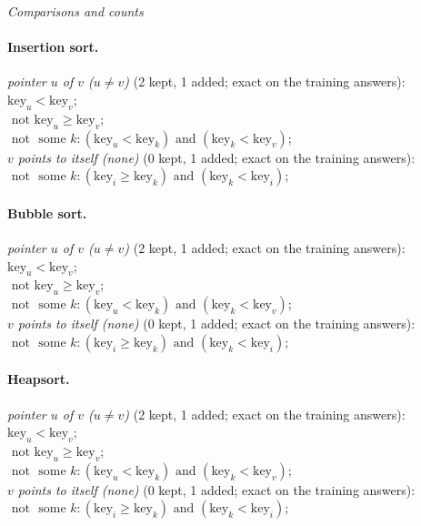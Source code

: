 \documentclass[10pt]{article}
\begin{document}
{\small
\medskip\noindent\textit{Comparisons and counts}\par
\paragraph{Insertion sort.}
\emph{pointer $u$ of $v$ ($u \neq v$)} (2 kept, 1 added; exact on the training answers):\\
\quad $\mathrm{key}_{u} < \mathrm{key}_{v}$;\\
\quad $\text{ not } \mathrm{key}_{u}  \geq  \mathrm{key}_{v}$;\\
\quad $\text{ not } \text{ some } k: (\mathrm{key}_{u} < \mathrm{key}_{k}) \text{ and } (\mathrm{key}_{k} < \mathrm{key}_{v})$;\\
\emph{$v$ points to itself (none)} (0 kept, 1 added; exact on the training answers):\\
\quad $\text{ not } \text{ some } k: (\mathrm{key}_{i}  \geq  \mathrm{key}_{k}) \text{ and } (\mathrm{key}_{k} < \mathrm{key}_{i})$;

\paragraph{Bubble sort.}
\emph{pointer $u$ of $v$ ($u \neq v$)} (2 kept, 1 added; exact on the training answers):\\
\quad $\mathrm{key}_{u} < \mathrm{key}_{v}$;\\
\quad $\text{ not } \mathrm{key}_{u}  \geq  \mathrm{key}_{v}$;\\
\quad $\text{ not } \text{ some } k: (\mathrm{key}_{u} < \mathrm{key}_{k}) \text{ and } (\mathrm{key}_{k} < \mathrm{key}_{v})$;\\
\emph{$v$ points to itself (none)} (0 kept, 1 added; exact on the training answers):\\
\quad $\text{ not } \text{ some } k: (\mathrm{key}_{i}  \geq  \mathrm{key}_{k}) \text{ and } (\mathrm{key}_{k} < \mathrm{key}_{i})$;

\paragraph{Heapsort.}
\emph{pointer $u$ of $v$ ($u \neq v$)} (2 kept, 1 added; exact on the training answers):\\
\quad $\mathrm{key}_{u} < \mathrm{key}_{v}$;\\
\quad $\text{ not } \mathrm{key}_{u}  \geq  \mathrm{key}_{v}$;\\
\quad $\text{ not } \text{ some } k: (\mathrm{key}_{u} < \mathrm{key}_{k}) \text{ and } (\mathrm{key}_{k} < \mathrm{key}_{v})$;\\
\emph{$v$ points to itself (none)} (0 kept, 1 added; exact on the training answers):\\
\quad $\text{ not } \text{ some } k: (\mathrm{key}_{i}  \geq  \mathrm{key}_{k}) \text{ and } (\mathrm{key}_{k} < \mathrm{key}_{i})$;

}
\end{document}
